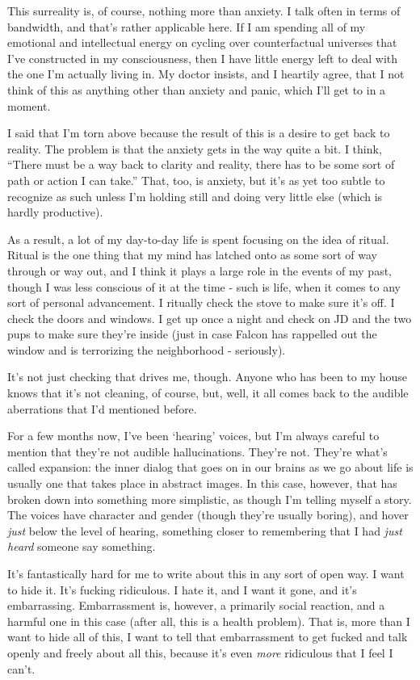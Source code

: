 This surreality is, of course, nothing more than anxiety. I talk often in terms of bandwidth, and that's rather applicable here. If I am spending all of my emotional and intellectual energy on cycling over counterfactual universes that I've constructed in my consciousness, then I have little energy left to deal with the one I'm actually living in. My doctor insists, and I heartily agree, that I not think of this as anything other than anxiety and panic, which I'll get to in a moment.

I said that I'm torn above because the result of this is a desire to get back to reality. The problem is that the anxiety gets in the way quite a bit. I think, ``There must be a way back to clarity and reality, there has to be some sort of path or action I can take.'' That, too, is anxiety, but it's as yet too subtle to recognize as such unless I'm holding still and doing very little else (which is hardly productive).

As a result, a lot of my day-to-day life is spent focusing on the idea of ritual. Ritual is the one thing that my mind has latched onto as some sort of way through or way out, and I think it plays a large role in the events of my past, though I was less conscious of it at the time - such is life, when it comes to any sort of personal advancement. I ritually check the stove to make sure it's off. I check the doors and windows. I get up once a night and check on JD and the two pups to make sure they're inside (just in case Falcon has rappelled out the window and is terrorizing the neighborhood - seriously).

It's not just checking that drives me, though. Anyone who has been to my house knows that it's not cleaning, of course, but, well, it all comes back to the audible aberrations that I'd mentioned before.

For a few months now, I've been `hearing' voices, but I'm always careful to mention that they're not audible hallucinations. They're not. They're what's called expansion: the inner dialog that goes on in our brains as we go about life is usually one that takes place in abstract images. In this case, however, that has broken down into something more simplistic, as though I'm telling myself a story. The voices have character and gender (though they're usually boring), and hover \emph{just} below the level of hearing, something closer to remembering that I had \emph{just heard} someone say something.

It's fantastically hard for me to write about this in any sort of open way. I want to hide it. It's fucking ridiculous. I hate it, and I want it gone, and it's embarrassing. Embarrassment is, however, a primarily social reaction, and a harmful one in this case (after all, this is a health problem). That is, more than I want to hide all of this, I want to tell that embarrassment to get fucked and talk openly and freely about all this, because it's even \emph{more} ridiculous that I feel I can't.

